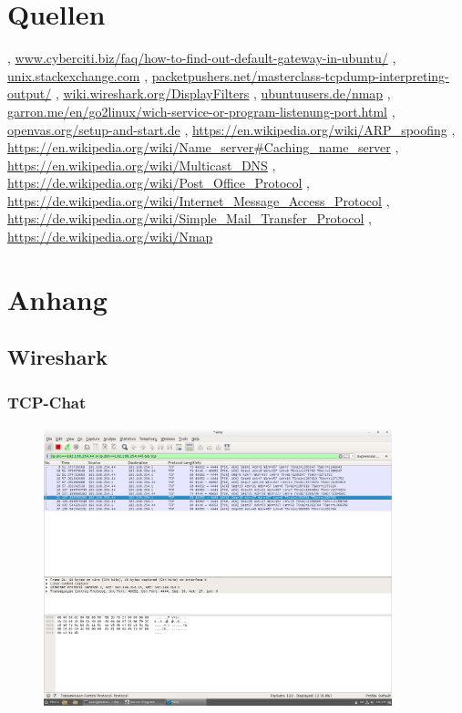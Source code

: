 \documentclass[12pt]{article}
\theoremstyle{plain}
\begin{document}
\section{Quellen}
\begin{thebibliography}{50}
\bibitem  [Cyberciti], \url{www.cyberciti.biz/faq/how-to-find-out-default-gateway-in-ubuntu/}
\bibitem [Stackexchange] , \url{unix.stackexchange.com}
\bibitem [Tcpdump], \url{packetpushers.net/masterclass-tcpdump-interpreting-output/}
\bibitem [Wireshark], \url{wiki.wireshark.org/DisplayFilters}
\bibitem [Nmap 1], \url{ubuntuusers.de/nmap}
\bibitem [Nmap 2], \url{garron.me/en/go2linux/wich-service-or-program-listenung-port.html}
\bibitem [OpenVAS], \url{openvas.org/setup-and-start.de}
, \url{https://en.wikipedia.org/wiki/ARP_spoofing}
\bibitem [DNS], \url{https://en.wikipedia.org/wiki/Name_server#Caching_name_server}
\bibitem [DNS 2], \url{https://en.wikipedia.org/wiki/Multicast_DNS}
\bibitem [POP], \url{https://de.wikipedia.org/wiki/Post_Office_Protocol}
\bibitem [IMAP], \url{https://de.wikipedia.org/wiki/Internet_Message_Access_Protocol}
\bibitem [SMTP], \url{https://de.wikipedia.org/wiki/Simple_Mail_Transfer_Protocol}
\bibitem [Nmap 3], \url{https://de.wikipedia.org/wiki/Nmap}	
\end{thebibliography}
\newpage
\section{Anhang}
\subsection*{Wireshark}
\subsubsection*{TCP-Chat}
\begin{figure}[!ht]
	\centering
     \includegraphics[width=0.9\textwidth]{Bilder/tcp-chat_1.png}
\end{figure}
\newpage
\end{document}

